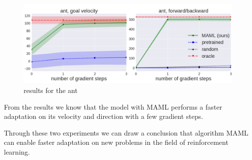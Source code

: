 \begin{figure}[H]
	\includegraphics[scale=0.27]{MAML_06.PNG}
	\centering
	\caption{results for the ant}
	\label{MAML}
\end{figure}

From the results we know that the model with MAML performs a faster adaptation on its velocity and direction with a few gradient steps.

Through these two experiments we can draw a conclusion that algorithm MAML can enable faster adaptation on new problems in the field of reinforcement learning. 
